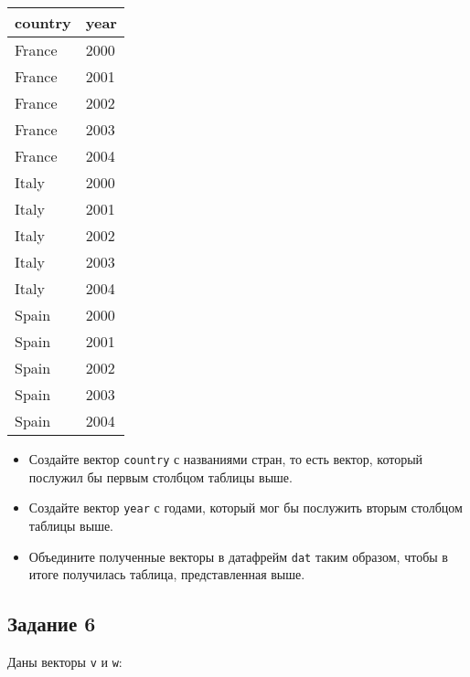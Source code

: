 \documentclass[
]{article}
\begin{document}
\begin{table}[]
\centering
\begin{tabular}{|l|l|}
\hline
\textbf{country} & \textbf{year} \\ \hline
France           & 2000          \\ \hline
France           & 2001          \\ \hline
France           & 2002          \\ \hline
France           & 2003          \\ \hline
France           & 2004          \\ \hline
Italy            & 2000          \\ \hline
Italy            & 2001          \\ \hline
Italy            & 2002          \\ \hline
Italy            & 2003          \\ \hline
Italy            & 2004          \\ \hline
Spain            & 2000          \\ \hline
Spain            & 2001          \\ \hline
Spain            & 2002          \\ \hline
Spain            & 2003          \\ \hline
Spain            & 2004          \\ \hline
\end{tabular}
\end{table}

\begin{itemize}
\item
  Создайте вектор \texttt{country} с названиями стран, то есть вектор,
  который послужил бы первым столбцом таблицы выше.
\item
  Создайте вектор \texttt{year} с годами, который мог бы послужить
  вторым столбцом таблицы выше.
\item
  Объедините полученные векторы в датафрейм \texttt{dat} таким образом,
  чтобы в итоге получилась таблица, представленная выше.
\end{itemize}

\hypertarget{ux437ux430ux434ux430ux43dux438ux435-6}{%
\subsection{Задание 6}\label{ux437ux430ux434ux430ux43dux438ux435-6}}

Даны векторы \texttt{v} и \texttt{w}:
\end{document}
